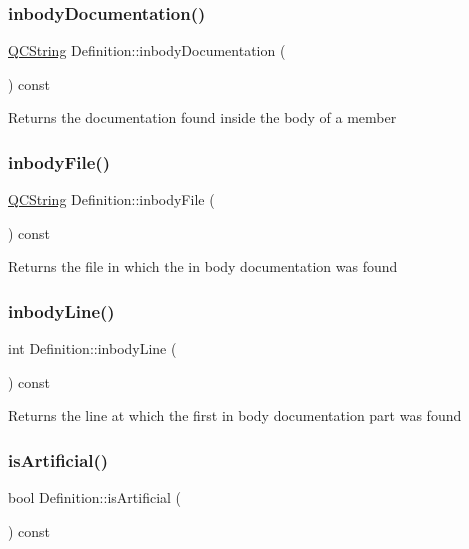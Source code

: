 \subsubsection{\texorpdfstring{inbodyDocumentation()}{inbodyDocumentation()}}
{\footnotesize\ttfamily \mbox{\hyperlink{class_q_c_string}{Q\+C\+String}} Definition\+::inbody\+Documentation (\begin{DoxyParamCaption}{ }\end{DoxyParamCaption}) const}

Returns the documentation found inside the body of a member \mbox{\label{class_definition_affe50047c647407853ecc16bd99dc2f8}} 
\subsubsection{\texorpdfstring{inbodyFile()}{inbodyFile()}}
{\footnotesize\ttfamily \mbox{\hyperlink{class_q_c_string}{Q\+C\+String}} Definition\+::inbody\+File (\begin{DoxyParamCaption}{ }\end{DoxyParamCaption}) const}

Returns the file in which the in body documentation was found \mbox{\label{class_definition_a59ecd8ca92f7952c598bf01da8ae7582}} 
\subsubsection{\texorpdfstring{inbodyLine()}{inbodyLine()}}
{\footnotesize\ttfamily int Definition\+::inbody\+Line (\begin{DoxyParamCaption}{ }\end{DoxyParamCaption}) const}

Returns the line at which the first in body documentation part was found \mbox{\label{class_definition_a24d80ca0884834c9e767482af37b7248}} 
\subsubsection{\texorpdfstring{isArtificial()}{isArtificial()}}
{\footnotesize\ttfamily bool Definition\+::is\+Artificial (\begin{DoxyParamCaption}{ }\end{DoxyParamCaption}) const}

